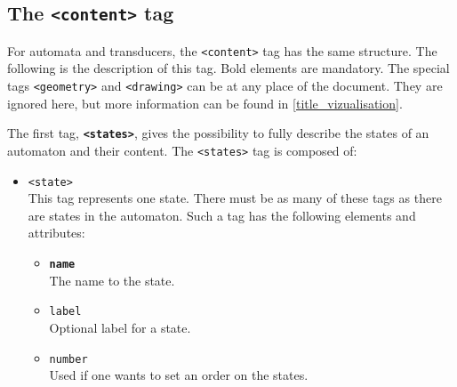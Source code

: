 \documentclass[a4paper]{article}
\newcommand{\xtag}[1]{\texttt{<#1>}}
\newcommand{\xattr}[1]{\texttt{#1}}
\def\contenttag{\xtag{content}}
\def\statestag{\xtag{states}}
\def\statetag{\xtag{state}}
\def\dstname{\xattr{dst}}
\def\srcname{\xattr{src}}
\def\geometrytag{\xtag{geometry}}
\def\drawingtag{\xtag{drawing}}
\begin{document}

\subsection{The \contenttag{} tag}

For automata and transducers, the \contenttag{} tag has the same
structure.  The following is the description of this tag. Bold
elements are mandatory.  The special tags \geometrytag{} and
\drawingtag{} can be at any place of the document. They are ignored
here, but more information can be found in
\autoref{title_vizualisation}.

\medskip

The first tag, \textbf{\statestag{}}, gives the possibility to fully
describe the states of an automaton and their content. The
\statestag{} tag is composed of:
\begin{itemize}
\item \statetag{}\\
  This tag represents one state. There must be as many of these tags
  as there are states in the automaton. Such a tag has the following
  elements and attributes:
  \begin{itemize}
  \item \textbf{\xattr{name}}\\
    The name to the state.
  \item \xattr{label}\\
    Optional label for a state.
  \item \xattr{number}\\
    Used if one wants to set an order on the states.~\\
  \end{itemize}
\end{itemize}
\end{document}
